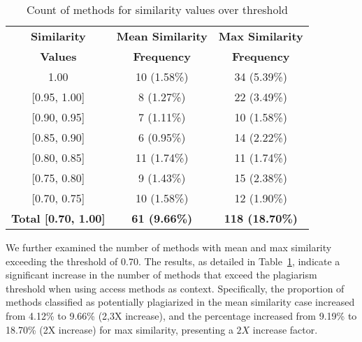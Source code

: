 \begin{table}[ht]\begin{center}
\caption{Count of methods for similarity values over threshold} 

\begin{tabular}{c|c|c}
\toprule
\textbf{Similarity}             & \textbf{Mean Similarity} & \textbf{Max Similarity} \\
\textbf{Values}                 & \textbf{Frequency}       & \textbf{Frequency}      \\ \midrule
1.00                            & 10 (1.58\%)              & 34 (5.39\%)             \\
{[}0.95, 1.00{]}                & 8 (1.27\%)               & 22 (3.49\%)             \\
{[}0.90, 0.95{]}                & 7 (1.11\%)               & 10 (1.58\%)             \\
{[}0.85, 0.90{]}                & 6 (0.95\%)               & 14 (2.22\%)             \\
{[}0.80, 0.85{]}                & 11 (1.74\%)              & 11 (1.74\%)             \\
{[}0.75, 0.80{]}                & 9 (1.43\%)               & 15 (2.38\%)             \\
{[}0.70, 0.75{]}                & 10 (1.58\%)              & 12 (1.90\%)             \\ \midrule
\textbf{Total {[}0.70, 1.00{]}} & \textbf{61 (9.66\%)}     & \textbf{118 (18.70\%)}  \\ \bottomrule
\end{tabular} 

\label{tab:count_methods_similarity_access} \end{center}
\end{table}

We further examined the number of methods with mean and max similarity exceeding the threshold of 0.70.
The results, as detailed in Table~\ref{tab:count_methods_similarity_access}, indicate a significant increase in the number of methods that exceed the plagiarism threshold when using access methods as context. Specifically, the proportion of methods classified as potentially plagiarized in the mean similarity case increased from 4.12\% to 9.66\% (2,3X increase), and the percentage increased from 9.19\% to 18.70\% (2X increase) for max similarity, presenting a $2X$ increase factor. 


